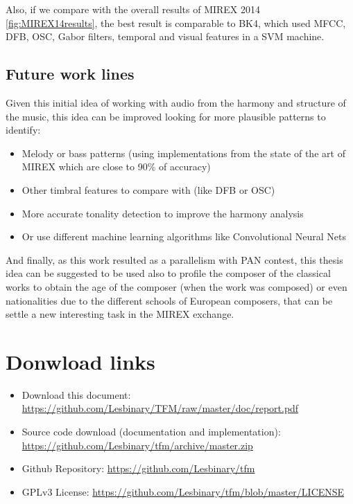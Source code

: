 \documentclass[a4paper,openany,oneside,12pt]{book}
\begin{document}
Also, if we compare with the overall results of MIREX 2014 \ref{fig:MIREX14results}, the best result is comparable to BK4, which used MFCC, DFB, OSC, Gabor filters, temporal and visual features in a SVM machine\cite{seung-ryoel}.

 

\section{Future work lines}
Given this initial idea of working with audio from the harmony and structure of the music, this idea can be improved looking for more plausible patterns to identify:

\begin{itemize}
\item Melody or bass patterns (using implementations from the state of the art of MIREX which are close to 90\% of accuracy)
\item Other timbral features to compare with (like DFB or OSC)
\item More accurate tonality detection to improve the harmony analysis
\item Or use different machine learning algorithms like Convolutional Neural Nets
\end{itemize}

And finally, as this work resulted as a parallelism with PAN contest, this thesis idea can be suggested to be used also to profile the composer of the classical works to obtain the age of the composer (when the work was composed) or even nationalities due to the different schools of European composers, that can be settle a new interesting task in the MIREX exchange.




\nocite{*}
\cleardoublepage
{}






\newpage
\thispagestyle{empty}
\mbox{}


\appendix
\chapter{Donwload links}\label{links}
\begin{itemize}

\item Download this document: \url{https://github.com/Lesbinary/TFM/raw/master/doc/report.pdf}

\item Source code download (documentation and implementation): \url{https://github.com/Lesbinary/tfm/archive/master.zip}

\item Github Repository: \url{https://github.com/Lesbinary/tfm}

\item GPLv3 License: \url{https://github.com/Lesbinary/tfm/blob/master/LICENSE}

\end{itemize}
\end{document}
